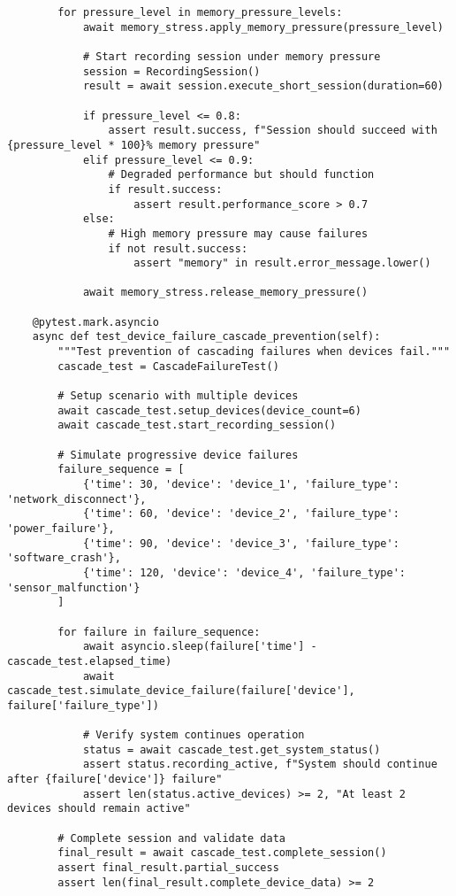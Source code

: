 \documentclass[11pt,a4paper]{report}
\begin{document}
\begin{verbatim}
        for pressure_level in memory_pressure_levels:
            await memory_stress.apply_memory_pressure(pressure_level)

            # Start recording session under memory pressure
            session = RecordingSession()
            result = await session.execute_short_session(duration=60)

            if pressure_level <= 0.8:
                assert result.success, f"Session should succeed with {pressure_level * 100}% memory pressure"
            elif pressure_level <= 0.9:
                # Degraded performance but should function
                if result.success:
                    assert result.performance_score > 0.7
            else:
                # High memory pressure may cause failures
                if not result.success:
                    assert "memory" in result.error_message.lower()

            await memory_stress.release_memory_pressure()

    @pytest.mark.asyncio
    async def test_device_failure_cascade_prevention(self):
        """Test prevention of cascading failures when devices fail."""
        cascade_test = CascadeFailureTest()

        # Setup scenario with multiple devices
        await cascade_test.setup_devices(device_count=6)
        await cascade_test.start_recording_session()

        # Simulate progressive device failures
        failure_sequence = [
            {'time': 30, 'device': 'device_1', 'failure_type': 'network_disconnect'},
            {'time': 60, 'device': 'device_2', 'failure_type': 'power_failure'},
            {'time': 90, 'device': 'device_3', 'failure_type': 'software_crash'},
            {'time': 120, 'device': 'device_4', 'failure_type': 'sensor_malfunction'}
        ]

        for failure in failure_sequence:
            await asyncio.sleep(failure['time'] - cascade_test.elapsed_time)
            await cascade_test.simulate_device_failure(failure['device'], failure['failure_type'])

            # Verify system continues operation
            status = await cascade_test.get_system_status()
            assert status.recording_active, f"System should continue after {failure['device']} failure"
            assert len(status.active_devices) >= 2, "At least 2 devices should remain active"

        # Complete session and validate data
        final_result = await cascade_test.complete_session()
        assert final_result.partial_success
        assert len(final_result.complete_device_data) >= 2
\end{verbatim}
\end{document}
